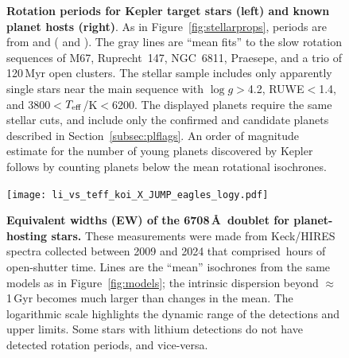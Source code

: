 \documentclass[11pt,twocolumn,tighten]{aastex63}
\begin{document}
\begin{figure}[!t]
  \begin{center}
  \end{center}
  \vspace{-0.5cm}
  \caption{
    {\bf Rotation periods for Kepler target stars (left) and known
    planet hosts (right)}.  As in Figure~\ref{fig:stellarprops}, periods are from \citet{Santos_2019}
    and \citet{Santos_2021} ( and
    ).  The gray lines are ``mean fits'' 
    to the slow rotation sequences of M67,
    Ruprecht~147, NGC~6811, Praesepe, and a trio of 120\,Myr open
    clusters.  The stellar sample includes only apparently single stars
    near the main sequence with $\log g$$>$4.2, RUWE$<$1.4,
    and 3800$<$$T_{\rm eff}$/K$<$6200.  The displayed planets require
    the same stellar cuts, and include only the confirmed and candidate planets
    described in Section~\ref{subsec:plflags}.
    An order of magnitude estimate for the number of young planets discovered
    by Kepler follows by counting planets below the mean rotational isochrones.
  }
  \label{fig:prot_vs_teff}
\end{figure}

\begin{figure}[!t]
  \begin{center}
    \leavevmode
    \texttt{[image: li\_vs\_teff\_koi\_X\_JUMP\_eagles\_logy.pdf]}
  \end{center}
  \vspace{-0.6cm}
  \caption{
    {\bf Equivalent widths (EW) of the  6708\,\AA\ doublet
      for planet-hosting stars.} These measurements were made from
    Keck/HIRES spectra collected between 2009 and 2024 that comprised
    \nhireshours\,hours of open-shutter time.  Lines are the ``mean''
    isochrones from the same models as in Figure~\ref{fig:models}; the
    intrinsic dispersion beyond $\approx$1\,Gyr becomes much larger
    than changes in the mean.  The logarithmic scale highlights the
    dynamic range of the detections and upper limits.  Some stars with
    lithium detections do not have detected rotation periods, and
    vice-versa.
    \label{fig:li_vs_teff}
  }
\end{figure}
\end{document}
